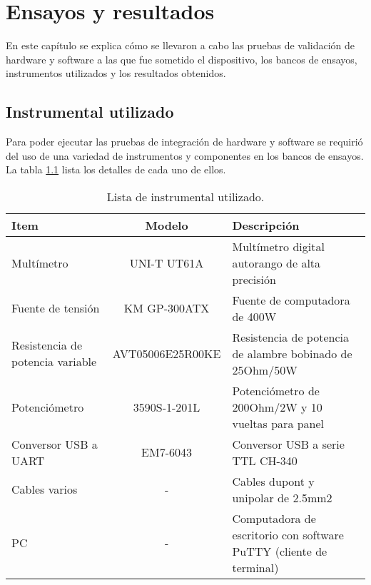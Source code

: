 
\chapter{Ensayos y resultados} %

\label{Chapter4} %


En este capítulo se explica cómo se llevaron a cabo las pruebas de validación de hardware y software a las que fue sometido el dispositivo, los bancos de ensayos, instrumentos utilizados y los resultados obtenidos.

\section{Instrumental utilizado}

Para poder ejecutar las pruebas de integración de hardware y software se requirió del uso de una variedad de instrumentos y componentes en los bancos de ensayos. La tabla \ref{tab:instrumentos} lista los detalles de cada uno de ellos.

\begin{table}[H]
	\centering
	\caption{Lista de instrumental utilizado.}
	\begin{tabular}{p{3cm} c p{6cm}}
		\toprule
		\textbf{Item} & \textbf{Modelo} & \textbf{Descripción} \\
		\midrule
		Multímetro			& UNI-T UT61A		& Multímetro digital autorango de alta precisión \\
		Fuente de tensión	& KM GP-300ATX		& Fuente de computadora de 400W \\
		Resistencia de potencia variable		& AVT05006E25R00KE	& Resistencia de potencia de alambre bobinado de 25Ohm/50W \\
		Potenciómetro							& 3590S-1-201L & Potenciómetro de 200Ohm/2W y 10 vueltas para panel \\
		Conversor USB a UART					& EM7-6043		& Conversor USB a serie TTL CH-340 \\
		Cables varios							& - 			& Cables dupont y unipolar de 2.5mm2 \\
		PC										& -				& Computadora de escritorio con software PuTTY (cliente de terminal) \\
		\bottomrule
		\hline
	\end{tabular}
	\label{tab:instrumentos}
\end{table}

